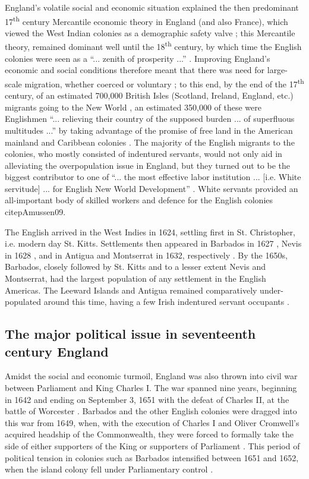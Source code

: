 England's volatile social and economic situation explained the then predominant 17\textsuperscript{th} century Mercantile economic theory in England (and also France), which viewed the West Indian colonies as a demographic safety valve \citep{Johnson22, Ayearst60, Games08}; this Mercantile theory, remained dominant well until the 18\textsuperscript{th} century, by which time the English colonies were seen as a ``... zenith of prosperity ...'' \citep[48]{MacMillan70}. Improving England's economic and social conditions therefore meant that there was need for large-scale migration, whether coerced or voluntary \citep{Amussen09}; to this end, by the end of the 17\textsuperscript{th} century, of an estimated 700,000 British Isles (Scotland, Ireland, England, etc.) migrants going to the New World \citep[54]{Games08}, an estimated 350,000 of these were Englishmen ``... relieving their country of the supposed burden ... of superfluous multitudes ...'' by taking advantage of the promise of free land in the American mainland and Caribbean colonies \citep[402]{Zahedieh01}. The majority of the English migrants to the colonies, who mostly consisted of indentured servants, would not only aid in alleviating the overpopulation issue in England, but they turned out to be the biggest contributor to one of ``... the most effective labor institution ... [i.e. White servitude] ... for English New World Development'' \citep[36]{Beckles89}. White servants provided an all-important body of skilled workers and defence for the English colonies citep{Amussen09}.

The English arrived in the West Indies in 1624, settling first in St. Christopher, i.e. modern day St. Kitts. Settlements then appeared in Barbados in 1627 \citep{Dunn73}, Nevis in 1628 \citep{Wroughton06}, and in Antigua and Montserrat in 1632, respectively \citep{Forsyth69}. By the 1650s, Barbados, closely followed by St. Kitts and to a lesser extent Nevis and Montserrat, had the largest population of any settlement in the English Americas. The Leeward Islands and Antigua remained comparatively under-populated around this time, having a few Irish indentured servant occupants \citep{Davis87, Galenson02}.


\subsection{The major political issue in seventeenth century England}\label{6.1.2}
Amidst the social and economic turmoil, England was also thrown into civil war between Parliament and King Charles I. The war spanned nine years, beginning in 1642 and ending on September 3, 1651 with the defeat of Charles II, at the battle of Worcester \citep{Young73}. Barbados and the other English colonies were dragged into this war from 1649, when, with the execution of Charles I and Oliver Cromwell's acquired headship of the Commonwealth, they were forced to formally take the side of either supporters of the King or supporters of Parliament \citep{Ligon73}. This period of political tension in colonies such as Barbados intensified between 1651 and 1652, when the island colony fell under Parliamentary control \citep{Ligon73, Fraser90}.

